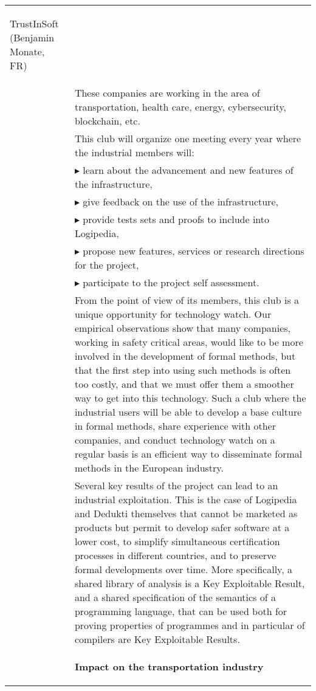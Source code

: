 \begin{longtable}{|p{}|p{}|}
\begin{framed}
\begin{compactitem}
\item TrustInSoft (Benjamin Monate, FR)
\end{compactitem}
\end{framed}\\
&
\hspace{0.4cm}
These companies are working in the area of transportation, health
care, energy, cybersecurity, blockchain, etc.
\\
&
\hspace{0.4cm}
This club will organize one meeting every year where the
industrial members will:\\
&
$\blacktriangleright$ 
learn about the advancement and new features of the infrastructure,\\
&
$\blacktriangleright$ 
give feedback on the use of the infrastructure,
\\
&
$\blacktriangleright$ provide tests sets and proofs to include into Logipedia,
\\
&
$\blacktriangleright$ propose new features, services or research directions for the project,
\\
&
$\blacktriangleright$ participate to the project self assessment.\\
&
\hspace{0.4cm}
From the point of view of its members, this club is a unique
opportunity for technology watch. Our empirical observations show that
many companies, working in safety critical areas, would like to be
more involved in the development of formal methods, but that the first
step into using such methods is often too costly, and that we must
offer them a smoother way to get into this technology. Such a club
where the industrial users will be able to develop a base culture in
formal methods, share experience with other companies, and conduct
technology watch on a regular basis is an efficient way to disseminate
formal methods in the European industry.\\
&
\hspace{0.4cm}
Several key results of the project can lead to an industrial
exploitation. This is the case of Logipedia and Dedukti themselves
that cannot be marketed as products but permit to develop safer
software at a lower cost, to simplify simultaneous certification
processes in different countries, and to preserve formal developments
over time. More specifically, a shared library of analysis is a Key
Exploitable Result, and a shared specification of the semantics of a
programming language, that can be used both for proving properties of
programmes and in particular of compilers
are Key Exploitable Results.\\
&
\begin{framed}
{\bf \Large Impact on the transportation industry}


\end{framed}
\end{longtable}
